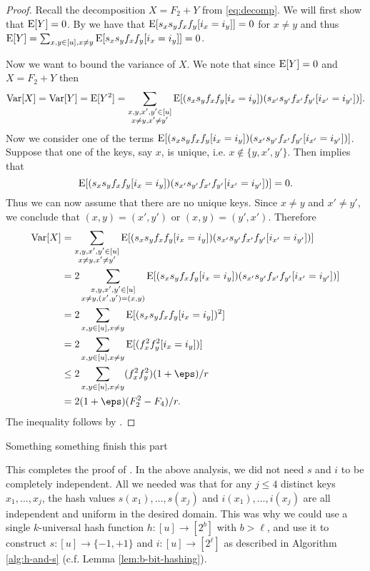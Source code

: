 \begin{proof}
   Recall the decomposition $X=F_2+Y$ from \cref{eq:decomp}.
    We will first show that $\operatorname*{E}[Y] = 0$.
    By  we have that $\operatorname*{E}[s_x s_y f_x f_y [i_x = i_y]] = 0$
    for $x \neq y$ and thus $\operatorname*{E}[Y] = \sum_{x,y\in[u],x\neq y} \operatorname*{E}[s_x s_y f_x f_y [i_x = i_y]] = 0$.

    Now we want to bound the variance of $X$. We note that since $\operatorname*{E}[Y] = 0$ and $X = F_2 + Y$ then
    \begin{align*}
        \operatorname*{Var}[X] = \operatorname*{Var}[Y] = \operatorname*{E}[Y^2]
            = \sum_{\substack{x, y, x', y' \in [u]\\ x \neq y, x' \neq y'}} \operatorname*{E}[(s_x s_y f_x f_y [i_x = i_y])(s_{x'} s_{y'} f_{x'} f_{y'} [i_{x'} = i_{y'}])] .
    \end{align*}
    Now we consider one of the terms $\operatorname*{E}[(s_x s_y f_x f_y [i_x = i_y])(s_{x'} s_{y'} f_{x'} f_{y'} [i_{x'} = i_{y'}])]$.
    Suppose that one of the keys, say $x$, is unique, i.e. $x \not\in \{y, x', y'\}$.
    Then  implies that 
    \[
        \operatorname*{E}[(s_x s_y f_x f_y [i_x = i_y])(s_{x'} s_{y'} f_{x'} f_{y'} [i_{x'} = i_{y'}])] = 0 .
    \]
    Thus we can now assume that there are no unique keys. Since $x \neq y$ and $x' \neq y'$, we conclude
    that $(x, y) = (x', y')$ or $(x, y) = (y', x')$. Therefore
    \begin{align*}
       \Var[X] &= \sum_{\substack{x, y, x', y' \in [u]\\ x \neq y, x' \neq y'}}
                \E[(s_x s_y f_x f_y [i_x = i_y])(s_{x'} s_{y'} f_{x'} f_{y'} [i_{x'} = i_{y'}])]
            \\&= 2 \sum_{\substack{x, y, x', y' \in [u]\\ x \neq y, (x', y') = (x, y)}}
                \E[(s_x s_y f_x f_y [i_x = i_y])(s_{x'} s_{y'} f_{x'} f_{y'} [i_{x'} = i_{y'}])]
            \\&= 2\sum_{x,y\in[u],x\neq y} \E[(s_x s_y f_x f_y[i_x=i_y])^2]
            \\&= 2\sum_{x,y\in[u],x\neq y} \E[(f_x^2f_y^2[i_x=i_y])]
            \\&\le 2\sum_{x,y\in[u],x\neq y} (f_x^2f_y^2)(1 + \eps)/r
            \\&= 2(1 + \eps) (F_2^2-F_4)/r.
    \end{align*}
    The inequality follows by .
\end{proof}
Something something finish this part

This completes the proof of . In the above analysis, we
did not need $s$ and $i$ to be completely independent. All we needed
was that for any $j\leq 4$ distinct keys $x_1,\ldots,x_j$, the hash
values $s(x_1),\ldots,s(x_j)$ and $i(x_1),\ldots,i(x_j)$ are all
independent and uniform in the desired domain. This was why we could
use a single $k$-universal hash function $h:[u]\to[2^b]$ with
$b>\ell$, and use it to construct $s:[u]\to\{-1,+1\}$ and
$i:[u]\to[2^\ell]$ as described in Algorithm \ref{alg:h-and-s}
(c.f. Lemma \ref{lem:b-bit-hashing}).

